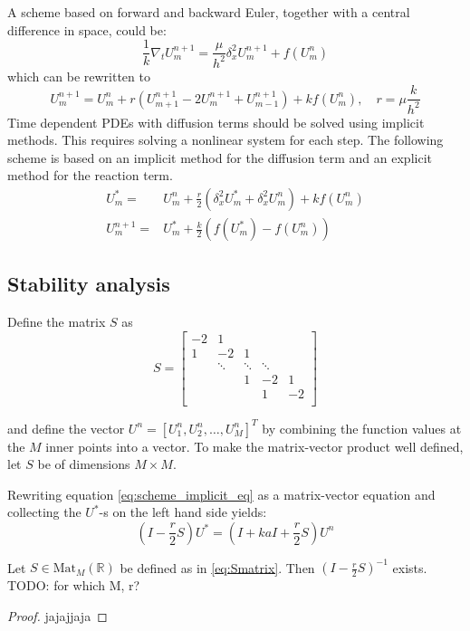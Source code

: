 A scheme based on forward and backward Euler,
together with a central difference in space, could be:
$$
  \frac{1}{k}\nabla_tU_{m}^{n+1}=\frac{\mu}{h^2}\delta_x^2U_{m}^{n+1}+f(U_{m}^{n} )
$$
which can be rewritten to 
$$
  U_{m}^{n+1} = U_{m}^{n} + r (U_{m+1}^{n+1}-2U_{m}^{n+1}+U_{m-1}^{n+1}) + kf(U_{m}^{n}), \quad r = \mu\frac{k}{h^2}
$$
Time dependent PDEs with diffusion terms should be solved using implicit methods.
This requires solving a nonlinear system for each step.
The following scheme is based on an implicit method
for the diffusion term and an explicit method for the reaction term.
\begin{align}
  \label{eq:scheme_implicit_eq}
    U_{m}^{*} =& U_{m}^{n} +\frac{r}{2}(\delta_x^2 U_{m}^{*} + \delta_x^2 U_{m}^{n} ) + kf(U_{m}^{n}) \\
  \label{eq:scheme_explicit_eq}
    U_{m}^{n+1} =& U_{m}^{*} + \frac{k}{2}(f(U_{m}^{*}) - f(U_{m}^{n}))
\end{align}

\subsection{Stability analysis}

Define the matrix \( S \) as
\begin{equation}
  \label{eq:Smatrix}
  S = 
  \begin{bmatrix}
    -2 & 1 &  &  & \\
    1& -2 & 1 &  & \\
     & \ddots & \ddots & \ddots & \\
     &  & 1 & -2 & 1\\
     &  &  & 1 & -2\\
  \end{bmatrix}
\end{equation}

and define the vector \( U^n = [U_1^n, U_2^n, \dots, U_M^n]^T \)
by combining the function values at the \( M \) inner points into a vector.
To make the matrix-vector product well defined, let \( S \) be of dimensions
\( M \times M \).

Rewriting equation \ref{eq:scheme_implicit_eq} as a matrix-vector equation
and collecting the \( U^* \)-s on the left hand side yields:
\begin{equation}
  (I - \frac{r}{2}S)U^* = (I + kaI + \frac{r}{2}S) U^n
\end{equation}

\begin{lemma}
  \label{lemma:existance_of_inverse}
  Let \( S \in \text{Mat}_M(\mathbb{R}) \) be defined as in \eqref{eq:Smatrix}.
  Then \( \left(I - \frac{r}{2}S\right)^{-1}\) exists. TODO: for which M, r?
\end{lemma}
\begin{proof}
    jajajjaja
\end{proof}

